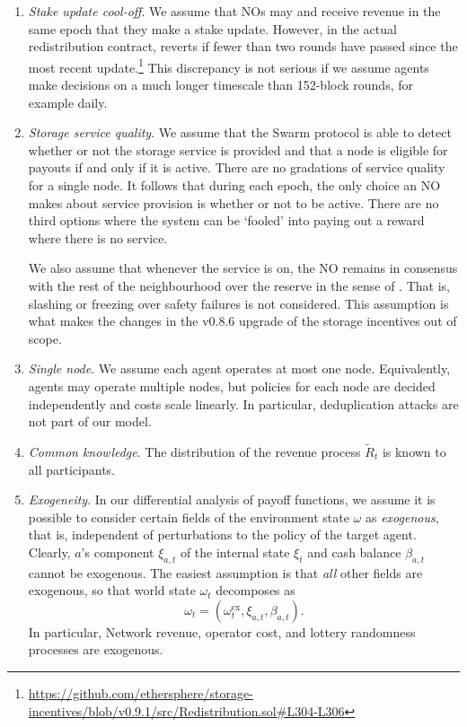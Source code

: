 \begin{enumerate}
  \item \emph{Stake update cool-off}. %
    We assume that NOs may  and receive revenue in the same epoch that they make a stake update.
    However, in the actual redistribution contract,  reverts if fewer than two rounds have passed since the most recent update.\footnote{\url{https://github.com/ethersphere/storage-incentives/blob/v0.9.1/src/Redistribution.sol\#L304-L306}}
    This discrepancy is not serious if we assume agents make decisions on a much longer timescale than 152-block rounds, for example daily.

  \item \emph{Storage service quality}. %
    We assume that the Swarm protocol is able to detect whether or not the storage service is provided and that a node is eligible for payouts if and only if it is active.
    There are no gradations of service quality for a single node.
    It follows that during each epoch, the only choice an NO makes about service provision is whether or not to be active.
    There are no third options where the system can be `fooled' into paying out a reward where there is no service.
    
    We also assume that whenever the service is on, the NO remains in consensus with the rest of the neighbourhood over the reserve in the sense of \cite[\S3.4.4]{book-of-swarm}.
    That is, slashing or freezing over safety failures is not considered.
    This assumption is what makes the changes in the v0.8.6 upgrade of the storage incentives out of scope.

  \item \emph{Single node}.
    We assume each agent operates at most one node.
    Equivalently, agents may operate multiple nodes, but policies for each node are decided independently and costs scale linearly.
    In particular, deduplication attacks are not part of our model.

  \item \emph{Common knowledge}.
    The distribution of the revenue process $\tilde{R}_t$ is known to all participants.

  \item \emph{Exogeneity}.
    In our differential analysis of payoff functions, we assume it is possible to consider certain fields of the environment state $\omega$ as \emph{exogenous}, that is, independent of perturbations to the policy of the target agent.
    Clearly, $a$'s component $\xi_{a,t}$ of the internal state $\xi_t$ and cash balance $\beta_{a,t}$ cannot be exogenous.
    The easiest assumption is that \emph{all} other fields are exogenous, so that world state $\omega_t$ decomposes as
    \[
      \omega_t = (\omega_t^\mathrm{ex},\xi_{a,t},\beta_{a,t}).
    \]
    In particular, Network revenue, operator cost, and lottery randomness processes are exogenous.


\end{enumerate}
